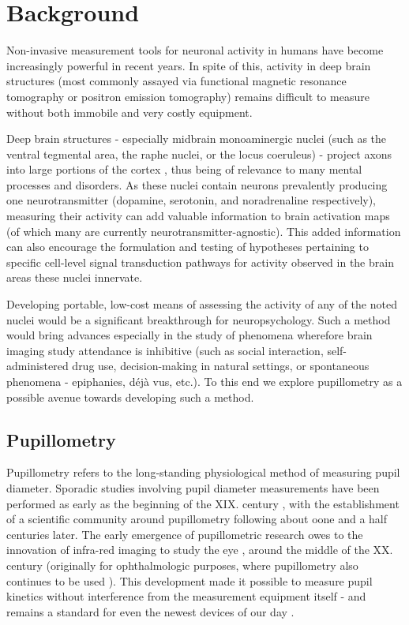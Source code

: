 \chapter{Background}
    Non-invasive measurement tools for neuronal activity in humans have become increasingly powerful in recent years.
    In spite of this, activity in deep brain structures (most commonly assayed via functional magnetic resonance tomography or positron emission tomography) remains difficult to measure without both immobile and very costly equipment.
    
    Deep brain structures - especially midbrain monoaminergic nuclei (such as the ventral tegmental area, the raphe nuclei, or the locus coeruleus) - project axons into large portions of the cortex \citep{vanDomburg1991,Hornung2003,Loughlin1982}, thus being of relevance to many mental processes and disorders.
    As these nuclei contain neurons prevalently producing one neurotransmitter (dopamine, serotonin, and noradrenaline respectively), measuring their activity can add valuable information to brain activation maps (of which many are currently neurotransmitter-agnostic).
    This added information can also encourage the formulation and testing of hypotheses pertaining to specific cell-level signal transduction pathways for activity observed in the brain areas these nuclei innervate.
    
    Developing portable, low-cost means of assessing the activity of any of the noted nuclei would be a significant breakthrough for neuropsychology.
    Such a method would bring advances especially in the study of phenomena wherefore brain imaging study attendance is inhibitive
    (such as social interaction, self-administered drug use, decision-making in natural settings, or spontaneous phenomena - epiphanies, déjà vus, etc.).
    To this end we explore pupillometry as a possible avenue towards developing such a method.
    \section{Pupillometry}\label{sec:b_p}
	Pupillometry refers to the long-standing physiological method of measuring pupil diameter.
	Sporadic studies involving pupil diameter measurements have been performed as early as the beginning of the XIX. century \citep{Loewenfeld1958},
	with the establishment of a scientific community around pupillometry following about oone and a half centuries later.
	The early emergence of pupillometric research owes to the innovation of infra-red imaging to study the eye \citep{Dubois1955}, around the middle of the XX. century (originally for ophthalmologic purposes, where pupillometry also continues to be used \citep{Thompson2012}).
	This development made it possible to measure pupil kinetics without interference from the measurement equipment itself - and remains a standard for even the newest devices of our day \citep{Bradley2010}.
	
